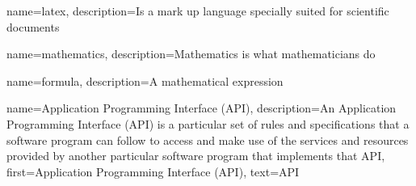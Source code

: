 {
        name=latex,
        description={Is a mark up language specially suited for scientific documents}
}

{
        name=mathematics,
        description={Mathematics is what mathematicians do}
}

{
        name=formula,
        description={A mathematical expression}
}

{
    name={Application Programming Interface (API)},
    description={An Application Programming Interface (API) is a particular set of rules and specifications that a software program can follow to access and make use of the services and resources provided by another particular software program that implements that API},
    first={Application Programming Interface (API)},
    text={API}
}





